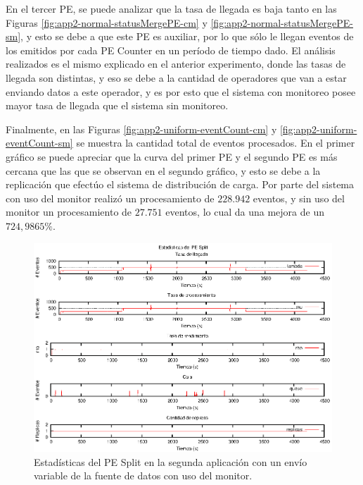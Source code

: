 En el tercer PE, se puede analizar que la tasa de llegada es baja tanto en las Figuras \ref{fig:app2-normal-statusMergePE-cm} y \ref{fig:app2-normal-statusMergePE-sm}, y esto se debe a que este PE es auxiliar, por lo que sólo le llegan eventos de los emitidos por cada PE Counter en un período de tiempo dado. El análisis realizados es el mismo explicado en el anterior experimento, donde las tasas de llegada son distintas, y eso se debe a la cantidad de operadores que van a estar enviando datos a este operador, y es por esto que el sistema con monitoreo posee mayor tasa de llegada que el sistema sin monitoreo.

Finalmente, en las Figuras \ref{fig:app2-uniform-eventCount-cm} y \ref{fig:app2-uniform-eventCount-sm} se muestra la cantidad total de eventos procesados. En el primer gráfico se puede apreciar que la curva del primer PE y el segundo PE es más cercana que las que se observan en el segundo gráfico, y esto se debe a la replicación que efectúo el sistema de distribución de carga. Por parte del sistema con uso del monitor realizó un procesamiento de $228.942$ eventos, y sin uso del monitor un procesamiento de $27.751$ eventos, lo cual da una mejora de un $724,9865\%$.

\begin{figure}[p]
\centering
    \includegraphics[scale=1.1]{images/exp/app2/normal/cm/statusSplitPE.eps}
    \caption{Estadísticas del PE Split en la segunda aplicación con un envío variable de la fuente de datos con uso del monitor.}
    \label{fig:app2-normal-statusSplitPE-cm}
\end{figure}

